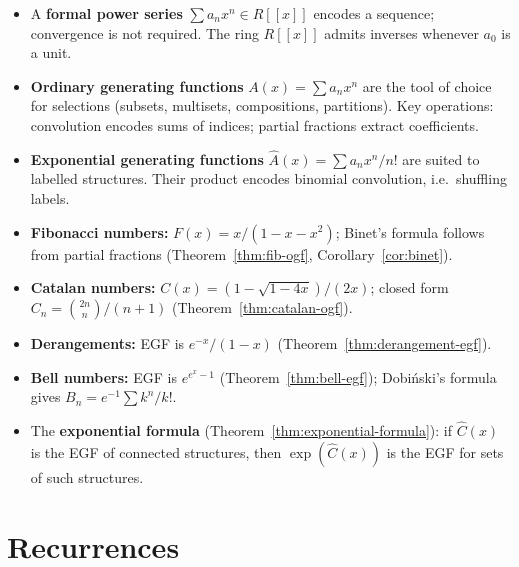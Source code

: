 \documentclass[12pt,a4paper,openany]{book}
\theoremstyle{definition}
\theoremstyle{plain}
\theoremstyle{remark}
\begin{document}
\begin{itemize}
  \item A \textbf{formal power series} $\sum a_n x^n \in R[[x]]$
    encodes a sequence; convergence is not required.  The ring $R[[x]]$
    admits inverses whenever $a_0$ is a unit.

  \item \textbf{Ordinary generating functions} $A(x) = \sum a_n x^n$
    are the tool of choice for selections (subsets, multisets,
    compositions, partitions).  Key operations: convolution encodes
    sums of indices; partial fractions extract coefficients.

  \item \textbf{Exponential generating functions}
    $\hat{A}(x) = \sum a_n x^n/n!$ are suited to labelled structures.
    Their product encodes binomial convolution, i.e.\ shuffling labels.

  \item \textbf{Fibonacci numbers:} $F(x) = x/(1-x-x^2)$;
    Binet's formula follows from partial fractions
    (Theorem~\ref{thm:fib-ogf}, Corollary~\ref{cor:binet}).

  \item \textbf{Catalan numbers:} $C(x) = (1-\sqrt{1-4x})/(2x)$;
    closed form $C_n = \binom{2n}{n}/(n+1)$
    (Theorem~\ref{thm:catalan-ogf}).

  \item \textbf{Derangements:} EGF is $e^{-x}/(1-x)$
    (Theorem~\ref{thm:derangement-egf}).

  \item \textbf{Bell numbers:} EGF is $e^{e^x-1}$
    (Theorem~\ref{thm:bell-egf}); Dobi\'nski's formula gives
    $B_n = e^{-1}\sum k^n/k!$.

  \item The \textbf{exponential formula}
    (Theorem~\ref{thm:exponential-formula}): if $\hat{C}(x)$ is the
    EGF of connected structures, then $\exp(\hat{C}(x))$ is the EGF
    for sets of such structures.
\end{itemize}


\chapter{Recurrences}\label{ch:recurrences}
\end{document}
